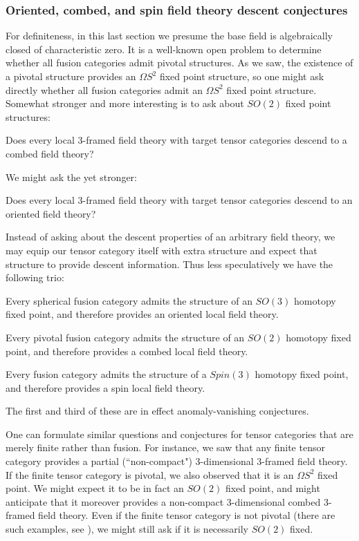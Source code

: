 \documentclass{amsart}
\begin{document}
\subsubsection{Oriented, combed, and spin field theory descent conjectures} \label{sec:descconj}

For definiteness, in this last section we presume the base field is algebraically closed of characteristic zero.  It is a well-known open problem to determine whether all fusion categories admit pivotal structures.  As we saw, the existence of a pivotal structure provides an $\Omega S^2$ fixed point structure, so one might ask directly whether all fusion categories admit an $\Omega S^2$ fixed point structure.  Somewhat stronger and more interesting is to ask about $SO(2)$ fixed point structures:
\begin{question}
Does every local 3-framed field theory with target tensor categories descend to a combed field theory?
\end{question}
\nid We might ask the yet stronger:
\begin{question}
Does every local 3-framed field theory with target tensor categories descend to an oriented field theory?
\end{question}

Instead of asking about the descent properties of an arbitrary field theory, we may equip our tensor category itself with extra structure and expect that structure to provide descent information.  Thus less speculatively we have the following trio:
\begin{conjecture}
Every spherical fusion category admits the structure of an $SO(3)$ homotopy fixed point, and therefore provides an oriented local field theory.
\end{conjecture}
\begin{conjecture}
Every pivotal fusion category admits the structure of an $SO(2)$ homotopy fixed point, and therefore provides a combed local field theory.
\end{conjecture}
\begin{conjecture}
Every fusion category admits the structure of a $Spin(3)$ homotopy fixed point, and therefore provides a spin local field theory.
\end{conjecture}
\nid The first and third of these are in effect anomaly-vanishing conjectures.

One can formulate similar questions and conjectures for tensor categories that are merely finite rather than fusion.  For instance, we saw that any finite tensor category provides a partial (``non-compact") 3-dimensional 3-framed field theory.  If the finite tensor category is pivotal, we also observed that it is an $\Omega S^2$ fixed point.  We might expect it to be in fact an $SO(2)$ fixed point, and might anticipate that it moreover provides a non-compact 3-dimensional combed 3-framed field theory.  Even if the finite tensor category is not pivotal (there are such examples, see \cite[Rem. 2.11]{1204.5807}), we might still ask if it is necessarily $SO(2)$ fixed.
\end{document}

